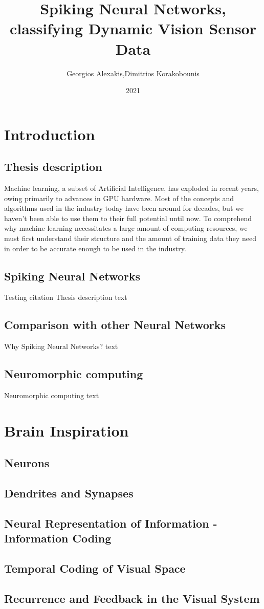\documentclass{report}
\title{Spiking Neural Networks, classifying Dynamic Vision Sensor Data }
\author{Georgios Alexakis,Dimitrios Korakobounis}
\date{2021}
\begin{document}
\maketitle

\tableofcontents{}
\chapter{Introduction}
     
\section{Thesis description}
Machine learning, a subset of Artificial Intelligence, has exploded in recent years, owing primarily to advances in GPU hardware. Most of the concepts and algorithms used in the industry today have been around for decades, but we haven't been  able to use them to their full potential until now. To comprehend why machine learning necessitates a large amount of computing resources, we must first understand their structure and the amount of training data they need in order to be accurate enough to be used in the industry.
\section{Spiking Neural Networks}
Testing citation   \cite{Esser2016}
Thesis description text
\section{Comparison with other Neural Networks}

Why Spiking Neural Networks? text

\section{Neuromorphic computing}

Neuromorphic computing text

\chapter{Brain Inspiration}
\section{Neurons}
\section{Dendrites and Synapses}
\section{Neural Representation of Information - Information Coding}
\section{Temporal Coding of Visual Space}
\section{Recurrence and Feedback in the Visual System}




\end{document}
